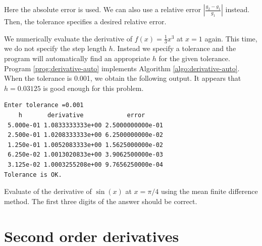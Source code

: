 \bigskip\noindent
Here the absolute error is used.  We can also use a relative error $\left |\displaystyle \frac{g_2 - g_1}{g_1} \right |$ instead. Then, the tolerance specifies a desired relative error. 

\begin{example}
We numerically evaluate the derivative of  $f(x)=\displaystyle\frac{1}{3}x^3$ at $x=1$ again.  This time, we do not specify the step length $h$. Instead we specify a tolerance and the program will automatically find an appropriate $h$ for the given tolerance.  Program \ref{prog:derivative-auto} implements Algorithm \ref{algo:derivative-auto}.  When the tolerance is 0.001, we obtain the following output.
It appears that $h=0.03125$ is good enough for this problem.  



\begin{mybox}
\small
\begin{verbatim}
Enter tolerance =0.001
    h       derivative            error
 5.000e-01 1.0833333333e+00 2.5000000000e-01
 2.500e-01 1.0208333333e+00 6.2500000000e-02
 1.250e-01 1.0052083333e+00 1.5625000000e-02
 6.250e-02 1.0013020833e+00 3.9062500000e-03
 3.125e-02 1.0003255208e+00 9.7656250000e-04
Tolerance is OK.
\end{verbatim}
\normalsize
\end{mybox}
\end{example}

\vspace{18px}
\noindent
\exercise
Evaluate of the derivative of $\sin(x)$ at $x=\pi/4$ using the mean finite difference method.  The first three digits of the answer should be correct.

\vspace{18px}

\noindent
\section{Second order derivatives}

